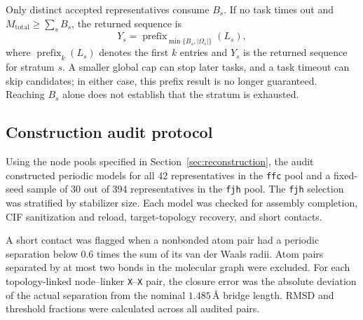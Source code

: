 \documentclass[a5paper, 10pt]{article}
\begin{document}
Only distinct accepted representatives consume $B_s$. If no task times out and $M_{\mathrm{total}}\geq\sum_s B_s$, the returned sequence is
\begin{equation}
Y_s=\operatorname{prefix}_{\min\{B_s,|\Omega_s|\}}(L_s),
\label{eq:quota_prefix}
\end{equation}
where $\operatorname{prefix}_k(L_s)$ denotes the first $k$ entries and $Y_s$ is the returned sequence for stratum $s$. A smaller global cap can stop later tasks, and a task timeout can skip candidates; in either case, this prefix result is no longer guaranteed. Reaching $B_s$ alone does not establish that the stratum is exhausted.

\subsection{Construction audit protocol}
\label{app:reconstruction_audit}

Using the node pools specified in Section~\ref{sec:reconstruction}, the audit constructed periodic models for all 42 representatives in the \texttt{ffc} pool and a fixed-seed sample of 30 out of 394 representatives in the \texttt{fjh} pool. The \texttt{fjh} selection was stratified by stabilizer size. Each model was checked for assembly completion, CIF sanitization and reload, target-topology recovery, and short contacts.

A short contact was flagged when a nonbonded atom pair had a periodic separation below $0.6$ times the sum of its van der Waals radii. Atom pairs separated by at most two bonds in the molecular graph were excluded. For each topology-linked node--linker \texttt{X}--\texttt{X} pair, the closure error was the absolute deviation of the actual separation from the nominal $1.485$\,\AA{} bridge length. RMSD and threshold fractions were calculated across all audited pairs.
\end{document}
